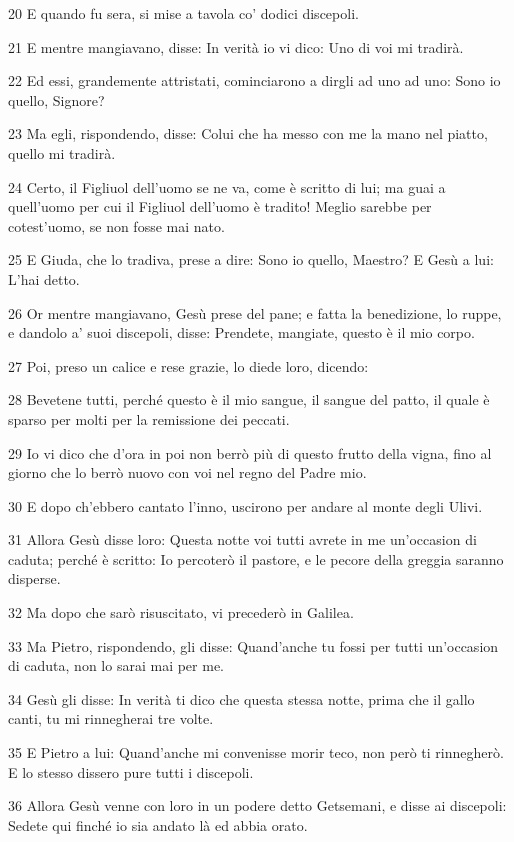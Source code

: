 \par 20 E quando fu sera, si mise a tavola co' dodici discepoli.
\par 21 E mentre mangiavano, disse: In verità io vi dico: Uno di voi mi tradirà.
\par 22 Ed essi, grandemente attristati, cominciarono a dirgli ad uno ad uno: Sono io quello, Signore?
\par 23 Ma egli, rispondendo, disse: Colui che ha messo con me la mano nel piatto, quello mi tradirà.
\par 24 Certo, il Figliuol dell'uomo se ne va, come è scritto di lui; ma guai a quell'uomo per cui il Figliuol dell'uomo è tradito! Meglio sarebbe per cotest'uomo, se non fosse mai nato.
\par 25 E Giuda, che lo tradiva, prese a dire: Sono io quello, Maestro? E Gesù a lui: L'hai detto.
\par 26 Or mentre mangiavano, Gesù prese del pane; e fatta la benedizione, lo ruppe, e dandolo a' suoi discepoli, disse: Prendete, mangiate, questo è il mio corpo.
\par 27 Poi, preso un calice e rese grazie, lo diede loro, dicendo:
\par 28 Bevetene tutti, perché questo è il mio sangue, il sangue del patto, il quale è sparso per molti per la remissione dei peccati.
\par 29 Io vi dico che d'ora in poi non berrò più di questo frutto della vigna, fino al giorno che lo berrò nuovo con voi nel regno del Padre mio.
\par 30 E dopo ch'ebbero cantato l'inno, uscirono per andare al monte degli Ulivi.
\par 31 Allora Gesù disse loro: Questa notte voi tutti avrete in me un'occasion di caduta; perché è scritto: Io percoterò il pastore, e le pecore della greggia saranno disperse.
\par 32 Ma dopo che sarò risuscitato, vi precederò in Galilea.
\par 33 Ma Pietro, rispondendo, gli disse: Quand'anche tu fossi per tutti un'occasion di caduta, non lo sarai mai per me.
\par 34 Gesù gli disse: In verità ti dico che questa stessa notte, prima che il gallo canti, tu mi rinnegherai tre volte.
\par 35 E Pietro a lui: Quand'anche mi convenisse morir teco, non però ti rinnegherò. E lo stesso dissero pure tutti i discepoli.
\par 36 Allora Gesù venne con loro in un podere detto Getsemani, e disse ai discepoli: Sedete qui finché io sia andato là ed abbia orato.
